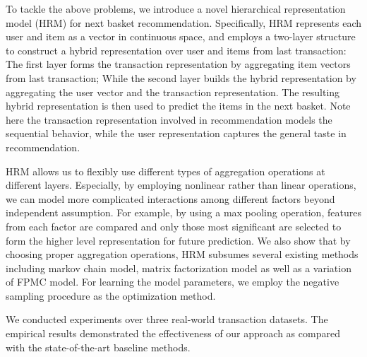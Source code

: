 \documentclass[10pt,journal,compsoc]{IEEEtran}
\begin{document}
To tackle the above problems, we introduce a novel hierarchical representation model (HRM) for next basket recommendation.
Specifically, HRM represents each user and item as a vector in continuous space, and employs a two-layer structure to construct a hybrid representation over user and items from last transaction: The first layer forms the transaction representation by aggregating item vectors from last transaction; While the second layer builds the hybrid representation by aggregating the user vector and the transaction representation. The resulting hybrid representation is then used to predict the items in the next basket.
Note here the transaction representation involved in recommendation models the sequential behavior, while the user representation captures the general taste in recommendation.

HRM allows us to flexibly use different types of aggregation operations at different layers.
Especially, by employing nonlinear rather than linear operations, we can model more complicated interactions among different factors beyond independent assumption. For example, by using a max pooling operation, features from each factor are compared and only those most significant are selected to form the higher level representation for future prediction.
We also show that by choosing proper aggregation operations, HRM subsumes several existing methods including markov chain model, matrix factorization model as well as a variation of FPMC model. For learning the model parameters, we employ the negative sampling procedure \cite{mikolov2013} as the optimization method.

We conducted experiments over three real-world transaction datasets. The empirical results demonstrated the effectiveness of our approach as compared with the state-of-the-art baseline methods.
\end{document}
